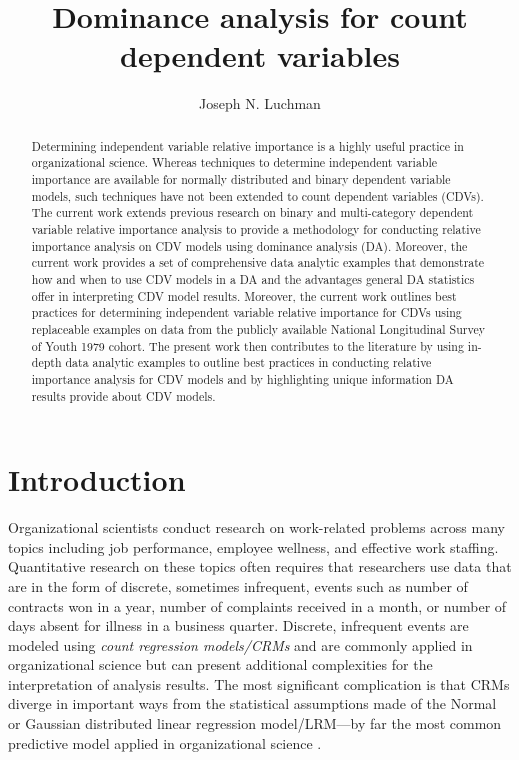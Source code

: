 \documentclass[ShortAfour,times,sageapa]{sagej}
\begin{document}
	
\title{Dominance analysis for count dependent variables}
\author{Joseph N. Luchman}

\begin{abstract}
	Determining independent variable relative importance is a highly useful practice in organizational science.  Whereas techniques to determine independent variable importance are available for normally distributed and binary dependent variable models, such techniques have not been extended to count dependent variables (CDVs).  The current work extends previous research on binary and multi-category dependent variable relative importance analysis to provide a methodology for conducting relative importance analysis on CDV models using dominance analysis (DA).  Moreover, the current work provides a set of comprehensive data analytic examples that demonstrate how and when to use CDV models in a DA and the advantages general DA statistics offer in interpreting CDV model results.  Moreover, the current work outlines best practices for determining independent variable relative importance for CDVs using replaceable examples on data from the publicly available National Longitudinal Survey of Youth 1979 cohort.  The present work then contributes to the literature by using in-depth data analytic examples to outline best practices in conducting relative importance analysis for CDV models and by highlighting unique information DA results provide about CDV models.
\end{abstract}


\maketitle

\section{Introduction}

	Organizational scientists conduct research on work-related problems across many topics including job performance, employee wellness, and effective work staffing.  
	Quantitative research on these topics often requires that researchers use data that are in the form of discrete, sometimes infrequent, events such as number of contracts won in a year, number of complaints received in a month, or number of days absent for illness in a business quarter. %
	Discrete, infrequent events are modeled using \textit{count regression models/CRMs} and are commonly applied in organizational science but can present additional complexities for the interpretation of analysis results.
	The most significant complication is that CRMs diverge in important ways from the statistical assumptions made of the Normal or Gaussian distributed linear regression model/LRM---by far the most common predictive model applied in organizational science \cite{}.
	
\end{document}
